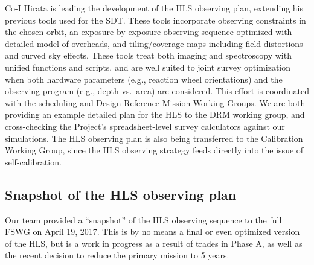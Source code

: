 

Co-I Hirata is leading the development of the HLS observing plan, extending his previous tools used for the SDT. These tools incorporate observing constraints in the chosen orbit, an exposure-by-exposure observing sequence optimized with detailed model of overheads, and tiling/coverage maps including field distortions and curved sky effects. These tools treat both imaging and spectroscopy with unified functions and scripts, and are well suited to joint survey optimization when both hardware parameters (e.g., reaction wheel orientations) and the observing program (e.g., depth vs.\ area) are considered. This effort is coordinated with the scheduling and Design Reference Mission Working Groups. We are both providing an example detailed plan for the HLS to the DRM working group, and cross-checking the Project's spreadsheet-level survey calculators against our simulations. The HLS observing plan is also being transferred to the Calibration Working Group, since the HLS observing strategy feeds directly into the issue of self-calibration.

\subsection{Snapshot of the HLS observing plan}
\label{ss:snapshot}

Our team provided a ``snapshot'' of the HLS observing sequence to the full FSWG on April 19, 2017. This is by no means a final or even optimized version of the HLS, but is a work in progress as a result of trades in Phase A, as well as the recent decision to reduce the primary mission to 5 years.

